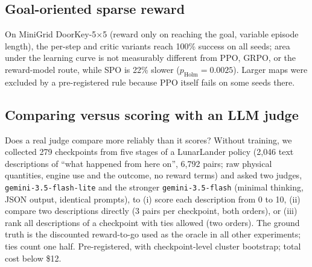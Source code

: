 \documentclass[11pt]{article}
\theoremstyle{remark}
\begin{document}
\subsection{Goal-oriented sparse reward}
On MiniGrid DoorKey-5$\times$5 (reward only on reaching the goal, variable episode length), the per-step and critic variants reach 100\% success on all seeds; area under the learning curve is not measurably different from PPO, GRPO, or the reward-model route, while SPO is 22\% slower ($p_{\text{Holm}}=0.0025$). Larger maps were excluded by a pre-registered rule because PPO itself fails on some seeds there.

\begin{table}[h]
\centering
\caption{MiniGrid DoorKey-5$\times$5, 500k steps, 10 seeds. AUC is the mean return over training (primary metric).}
\label{tab:goal}
\small
{}
\end{table}

\subsection{Comparing versus scoring with an LLM judge}
\label{sec:exp-judge}
Does a real judge compare more reliably than it scores? Without training, we collected 279 checkpoints from five stages of a LunarLander policy (2{,}046 text descriptions of ``what happened from here on'', 6{,}792 pairs; raw physical quantities, engine use and the outcome, no reward terms) and asked two judges, \texttt{gemini-3.5-flash-lite} and the stronger \texttt{gemini-3.5-flash} (minimal thinking, JSON output, identical prompts), to (i) score each description from 0 to 10, (ii) compare two descriptions directly (3 pairs per checkpoint, both orders), or (iii) rank all descriptions of a checkpoint with ties allowed (two orders). The ground truth is the discounted reward-to-go used as the oracle in all other experiments; ties count one half. Pre-registered, with checkpoint-level cluster bootstrap; total cost below \$12.

\begin{table}[h]
\centering
\caption{Effective pairwise accuracy of LLM judges against the true reward-to-go (ties count $\tfrac12$). Direct comparison is evaluated on the 823 pairs it was asked about; the other formats on all 6{,}792 pairs. Last two columns: advantage of comparison over scoring with 95\% cluster-bootstrap intervals.}
\label{tab:judge}
\small
\setlength{\tabcolsep}{4pt}
\end{table}
\end{document}
